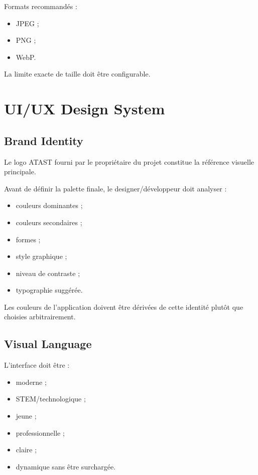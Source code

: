\documentclass[11pt,a4paper]{report}
\begin{document}
Formats recommandés :

\begin{itemize}
    \item JPEG ;
    \item PNG ;
    \item WebP.
\end{itemize}

La limite exacte de taille doit être configurable.

\chapter{UI/UX Design System}

\section{Brand Identity}

Le logo ATAST fourni par le propriétaire du projet constitue la référence visuelle principale.

Avant de définir la palette finale, le designer/développeur doit analyser :

\begin{itemize}
    \item couleurs dominantes ;
    \item couleurs secondaires ;
    \item formes ;
    \item style graphique ;
    \item niveau de contraste ;
    \item typographie suggérée.
\end{itemize}

Les couleurs de l'application doivent être dérivées de cette identité plutôt que choisies arbitrairement.

\section{Visual Language}

L'interface doit être :

\begin{itemize}
    \item moderne ;
    \item STEM/technologique ;
    \item jeune ;
    \item professionnelle ;
    \item claire ;
    \item dynamique sans être surchargée.
\end{itemize}
\end{document}
